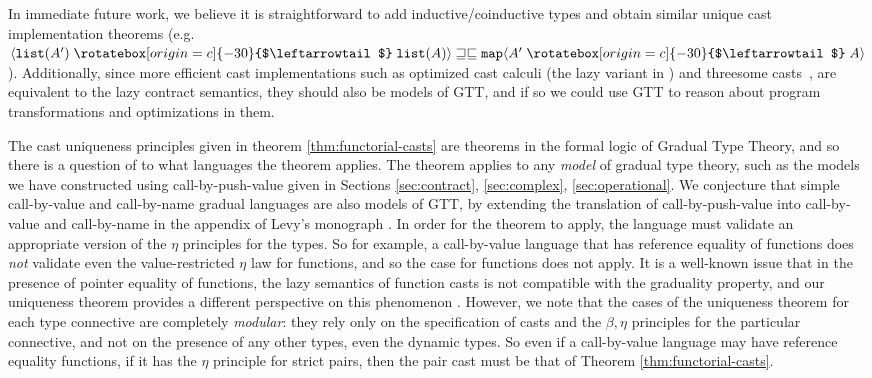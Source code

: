 \documentclass[acmsmall,nonacm]{acmart}
\newif\iflong
\newcommand{\ltdyn}{\sqsubseteq}
\newcommand{\gtdyn}{\sqsupseteq}
\newcommand{\equidyn}{\mathrel{\gtdyn\ltdyn}}
\newcommand{\uarrow}{\mathrel{\rotatebox[origin=c]{-30}{$\leftarrowtail$}}}
\newcommand{\upcast}[2]{\langle{#2}\uarrow{#1}\rangle}
\begin{document}
{\fi
In immediate future work, we believe it is straightforward to add
inductive/coinductive types and obtain similar unique cast
implementation theorems
(e.g. $\upcast{\mathtt{list}(A)}{\mathtt{list}(A')} \equidyn
\mathtt{map}\upcast{A}{A'}$).  Additionally, since more efficient cast
implementations such as optimized cast calculi (the lazy variant in
\citet{herman2010spaceefficient}) and threesome
casts~\cite{siekwadler10zigzag}, are equivalent to the lazy contract
semantics, they should also be models of GTT, and if so we could use GTT
to reason about program transformations and optimizations in them.

\iflong
\paragraph{Applicability of Cast Uniqueness Principles}
\fi

The cast uniqueness principles given in theorem
\ref{thm:functorial-casts} are theorems in the formal logic of Gradual
Type Theory, and so there is a question of to what languages the
theorem applies.
%
The theorem applies to any \emph{model} of gradual type theory, such
as the models we have constructed using call-by-push-value given in
Sections \ref{sec:contract}, \ref{sec:complex}, \ref{sec:operational}.
%
We conjecture that simple call-by-value and call-by-name gradual
languages are also models of GTT, by extending the translation of
call-by-push-value into call-by-value and call-by-name in the appendix
of Levy's monograph \cite{levy03cbpvbook}.
%
In order for the theorem to apply, the language must validate an
appropriate version of the $\eta$ principles for the types.
%
So for example, a call-by-value language that has reference equality
of functions does \emph{not} validate even the value-restricted $\eta$
law for functions, and so the case for functions does not apply.
%
It is a well-known issue that in the presence of pointer equality of
functions, the lazy semantics of function casts is not compatible with
the graduality property, and our uniqueness theorem provides a
different perspective on this phenomenon
\cite{findlerflattfelleisen04,chaperonesimpersonators, refined}.
%
However, we note that the cases of the uniqueness theorem for each
type connective are completely \emph{modular}: they rely only on the
specification of casts and the $\beta,\eta$ principles for the
particular connective, and not on the presence of any other types,
even the dynamic types.
%
So even if a call-by-value language may have reference equality
functions, if it has the $\eta$ principle for strict pairs, then the
pair cast must be that of Theorem \ref{thm:functorial-casts}.

}
\end{document}

